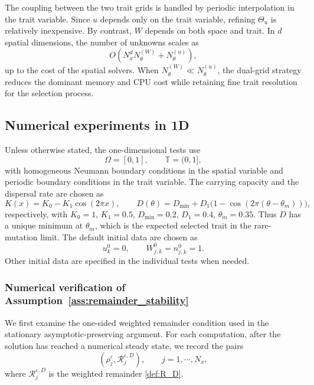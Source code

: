 \documentclass[11pt]{article}
\begin{document}
The coupling between the two trait grids is handled by periodic interpolation
in the trait variable.  Since \(u\) depends only on the trait variable,
refining \(\Theta_u\) is relatively inexpensive.  By contrast, \(W\) depends on
both space and trait.  In \(d\) spatial dimensions, the number of unknowns
scales as
\[
    O\!\left(N_x^d N_\theta^{(W)}+N_\theta^{(u)}\right),
\]
up to the cost of the spatial solvers.  When $N_\theta^{(W)} \ll N_\theta^{(u)}$, the dual-grid strategy reduces the
dominant memory and CPU cost while retaining fine trait resolution for the
selection process.


\subsection{Numerical experiments in 1D}
\label{subsec:numeric_1D}
Unless otherwise stated, the one-dimensional tests use
\[
    \Omega=[0,1],
    \qquad
    \mathbb T=(0,1],
\]
with homogeneous Neumann boundary conditions in the spatial variable and
periodic boundary conditions in the trait variable.  
The carrying capacity and the dispersal rate are chosen as 
\begin{equation}\label{eq:num_K_and_D}
    K(x)=K_0-K_1\cos(2\pi x),
    \qquad
    D(\theta) = D_{\min} + D_1\bigl(1-\cos(2\pi(\theta-\theta_m))\bigr),
\end{equation}
respectively, with $  K_0=1, \, K_1=0.5, \, D_{\min}=0.2,   \, D_1=0.4, \,   \theta_m=0.35$. 
Thus \(D\) has a unique minimum at \(\theta_m\), which is the expected selected
trait in the rare-mutation limit. 
The default initial data are chosen as 
\begin{equation}\label{eq:num_initial_W_new}
    u_k^0=0,
    \qquad
    W_{j,k}^0=n_{j,k}^0=1 .
\end{equation}
Other initial data are specified in the individual tests when needed.



\subsubsection{Numerical verification of Assumption~\ref{ass:remainder_stability}}
\label{subsec:test_assumptions_new}

We first examine the one-sided weighted remainder condition used in the
stationary asymptotic-preserving argument.  
For each computation, after the solution has reached a numerical steady state,
we record the pairs
\[
    \left(\rho_j^\varepsilon,\mathcal R_j^{\varepsilon,D}\right),
    \qquad j=1,\cdots, N_x, 
\]
where \(\mathcal R_j^{\varepsilon,D}\) is the weighted remainder \eqref{def:R_D}.
\end{document}
